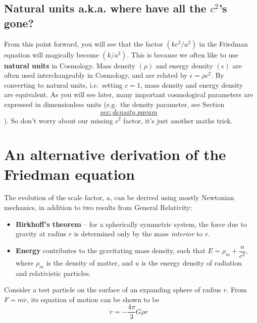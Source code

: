 \documentclass[]{book}
\begin{document}
\hypertarget{sec:natural_units}{%
\subsection{\texorpdfstring{Natural units a.k.a. where have all the \(c^2\)'s gone?}{Natural units a.k.a. where have all the c\^{}2's gone?}}\label{sec:natural_units}}

From this point forward, you will see that the factor
\(\left(k c^2/a^2\right)\) in the Friedman equation will magically become
\(\left(k/a^2\right)\). This is because we often like to use \textbf{natural
units} in Cosmology. Mass density \(\left(\rho\right)\) and energy
density \(\left(\epsilon\right)\) are often used interchangeably in
Cosmology, and are related by \(\epsilon = \rho c^2\). By converting to
natural units, i.e.~setting \(c=1\), mass density and energy density are
equivalent. As you will see later, many important cosmological
parameters are expressed in dimensionless units (e.g.~the density
parameter, see
Section~\protect\hyperlink{sec:density_param}{\[sec:density\_param\]}). So don't worry about our missing \(c^2\)
factor, it's just another maths trick.

\hypertarget{sec:alt_friedman}{%
\section{An alternative derivation of the Friedman equation}\label{sec:alt_friedman}}

The evolution of the scale factor, \(a\), can be derived using mostly
Newtonian mechanics, in addition to two results from General Relativity:

\begin{itemize}
\item
  \textbf{Birkhoff's theorem} -- for a spherically symmetric system, the
  force due to gravity at radius \(r\) is determined only by the mass
  \emph{interior} to \(r\).
\item
  \textbf{Energy} contributes to the gravitating mass density, such that
  \(E = \rho_m + \dfrac{u}{c^2}\), where \(\rho_m\) is the density of
  matter, and \(u\) is the energy density of radiation and relativistic
  particles.
\end{itemize}

Consider a test particle on the surface of an expanding sphere of radius
\(r\). From \(F= m \ddot{r}\), its equation of motion can be shown to be
\[\label{eqn:motion}
    \ddot{r} = -\dfrac{4\pi}{3} G \rho r\]
\end{document}
